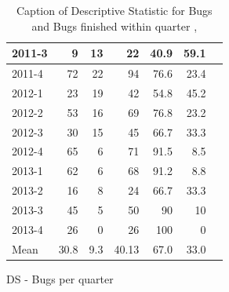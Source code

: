 \documentclass[UKenglish]{ifimaster}  %
\begin{document}
\begin{appendices}
\begin{table}[!htbp]
\begin{adjustwidth}{-2.5cm}{}
\begin{subfigure}[b]{0.4\textwidth}
{\begin{tabular}{ | l | r | r | r | r | r | r | }
2011-3 & 9 & 13 & 22 & 40.9 & 59.1 \\ \hline
2011-4 & 72 & 22 & 94 & 76.6& 23.4 \\ \hline
2012-1 & 23 & 19 & 42 & 54.8 & 45.2 \\ \hline
2012-2 & 53 & 16 & 69 & 76.8 & 23.2 \\ \hline
2012-3 & 30 & 15 & 45 & 66.7 & 33.3\\ \hline
2012-4 & 65 & 6 & 71 & 91.5 & 8.5 \\ \hline
2013-1 & 62 & 6 & 68 & 91.2 & 8.8 \\ \hline
2013-2 & 16 & 8 & 24 & 66.7 & 33.3 \\ \hline
2013-3 & 45 & 5 & 50 & 90 & 10 \\ \hline
2013-4 & 26 & 0 & 26 & 100 & 0 \\ \hline
Mean & 30.8&9.3&40.13&67.0&33.0 \\ \hline

\end{tabular}
}
\caption{DS - Bugs per quarter}
 \label{DS:FTPQ:10}
\end{subfigure}
\end{adjustwidth}
\caption[Optional caption for list of figures]{Caption of Descriptive Statistic for Bugs and Bugs finished within quarter  , }
\label{DS:10:5} %
\end{table}

\end{appendices}
 
\backmatter{}
\printbibliography
\end{document}
